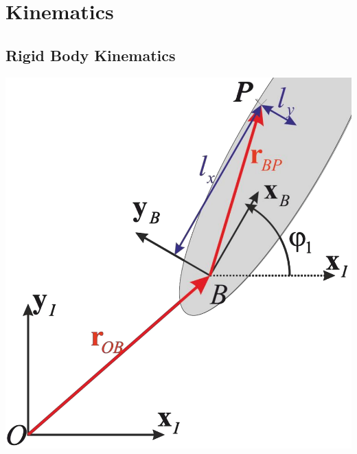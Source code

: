 
\section{Kinematics}
\subsection{Rigid Body Kinematics}
\includegraphics[width=\linewidth]{./Figures/03_RigidBodyTransformation.png}
